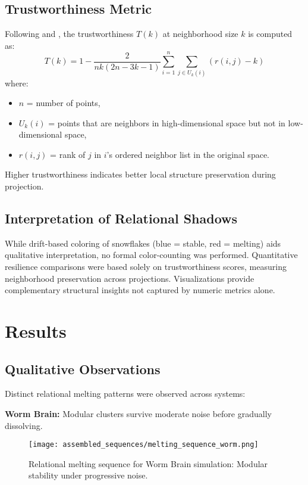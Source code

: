 \documentclass[conference]{IEEEtran}
\begin{document}
\subsection{Trustworthiness Metric}
Following \cite{umap} and \cite{tsne}, the trustworthiness $T(k)$ at neighborhood size $k$ is computed as:
\[
T(k) = 1 - \frac{2}{n k (2n - 3k -1)} \sum_{i=1}^n \sum_{j \in U_k(i)} (r(i,j) - k)
\]
where:
\begin{itemize}
    \item $n$ = number of points,
    \item $U_k(i)$ = points that are neighbors in high-dimensional space but not in low-dimensional space,
    \item $r(i,j)$ = rank of $j$ in $i$'s ordered neighbor list in the original space.
\end{itemize}
Higher trustworthiness indicates better local structure preservation during projection.

\subsection{Interpretation of Relational Shadows}
While drift-based coloring of snowflakes (blue = stable, red = melting) aids qualitative interpretation, no formal color-counting was performed. Quantitative resilience comparisons were based solely on trustworthiness scores, measuring neighborhood preservation across projections. Visualizations provide complementary structural insights not captured by numeric metrics alone.

\section{Results}

\subsection{Qualitative Observations}
Distinct relational melting patterns were observed across systems:

\textbf{Worm Brain:} Modular clusters survive moderate noise before gradually dissolving.

\begin{figure*}[htbp]
\centerline{\texttt{[image: assembled\_sequences/melting\_sequence\_worm.png]}}
\caption{Relational melting sequence for Worm Brain simulation: Modular stability under progressive noise.}
\label{fig:worm_melting}
\end{figure*}
\end{document}
